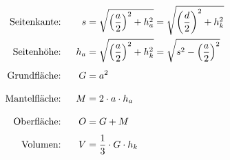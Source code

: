\begin{center}
\begin{minipage}{22em}
\begin{alignat*}{2}
        \text{Seitenkante:}&
        \gap
        s&=\sqrt{\left(\frac{a}{2}\right)^2+h_a^2}
          =\sqrt{\left(\frac{d}{2}\right)^2+h_k^2}
        \\
        \text{Seitenhöhe:}&
        \gap
        h_a&=\sqrt{\left(\frac{a}{2}\right)^2+h_k^2}
            =\sqrt{s^2-\left(\frac{a}{2}\right)^2}
        \\
        \text{Grundfläche:}&
        \gap
        G&=a^2
        \\
        \text{Mantelfläche:}&
        \gap
        M&=2\cdot a\cdot h_a
        \\
        \text{Oberfläche:}&
        \gap
        O&=G+M
        \\
        \text{Volumen:}&
        \gap
        V&=\frac{1}{3}\cdot G\cdot h_k
      \end{alignat*}%
    \end{minipage}%
  \end{center}
\fi








